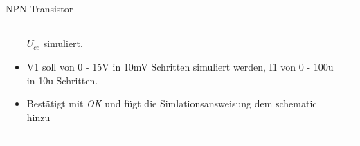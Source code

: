 \begin{frame}[t]{NPN-Transistor}
\begin{spacing}{0.9}
\begin{tiny}
\begin{table}[h!]
\begin{tabular}{p{3cm} p{7cm}}
\begin{minipage}{.7\textwidth}
\begin{itemize}
        $U_{ce}$ simuliert. 
        \item V1 soll von 0 - 15V in 10mV Schritten simuliert werden, I1 von 0 - 100u in 10u Schritten.
        \item Bestätigt mit \textit{OK} und fügt die Simlationsansweisung dem schematic hinzu
      \end{itemize}
      \end{minipage} 
      \\
       & \\
       \hline
    \end{tabular}
  
  \end{table}
  
  \end{tiny} \end{spacing}
  
   \end{frame}
  
